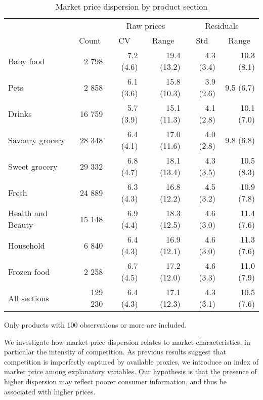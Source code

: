 \documentclass[english]{article}
\begin{document}
\begin{table}[htbp]
\caption{Market price dispersion by product section}
\label{tab:stats_market_dispersion}
\small
\begin{threeparttable}
\begin{tabular}{lrrrrr}
\toprule
      & \multicolumn{1}{c}{} & \multicolumn{2}{c}{Raw prices} & \multicolumn{2}{c}{Residuals} \\
      & \multicolumn{1}{c}{Count} & \multicolumn{1}{c}{CV} & \multicolumn{1}{c}{Range} & \multicolumn{1}{c}{Std} & \multicolumn{1}{c}{Range} \\
\midrule
Baby food & 2 798 & 7.2 (4.6) & 19.4 (13.2) & 4.3 (3.4) & 10.3 (8.1) \\
Pets  & 2 858 & 6.1 (3.6) & 15.8 (10.3) & 3.9 (2.6) & 9.5 (6.7) \\
Drinks & 16 759 & 5.7 (3.9) & 15.1 (11.3) & 4.1 (2.8) & 10.1 (7.0) \\
Savoury grocery & 28 348 & 6.4 (4.1) & 17.0 (11.6) & 4.0 (2.8) & 9.8 (6.8) \\
Sweet grocery & 29 332 & 6.8 (4.7) & 18.1 (13.4) & 4.3 (3.5) & 10.5 (8.3) \\
Fresh & 24 889 & 6.3 (4.3) & 16.8 (12.2) & 4.5 (3.2) & 10.9 (7.8) \\
Health and Beauty & 15 148 & 6.9 (4.4) & 18.3 (12.5) & 4.6 (3.0) & 11.4 (7.6) \\
Household & 6 840 & 6.4 (4.3) & 16.9 (12.1) & 4.6 (3.0) & 11.3 (7.6) \\
Frozen food & 2 258 & 6.7 (4.5) & 17.2 (12.0) & 4.6 (3.3) & 11.0 (7.9) \\
\midrule
All sections & 129 230 & 6.4 (4.3) & 17.1 (12.3) & 4.3 (3.1) & 10.5 (7.6) \\
\bottomrule
\bottomrule
\end{tabular}
\begin{tablenotes}
      \small
      \item Only products with 100 observations or more are included.
\end{tablenotes}
\end{threeparttable}
\end{table}

We investigate how market price dispersion relates to market characteristics, in particular the intensity of competition. As previous results suggest that competition is imperfectly captured by available proxies, we introduce an index of market price among explanatory variables. Our hypothesis is that the presence of higher dispersion may reflect poorer consumer information, and thus be associated with higher prices.
\end{document}
